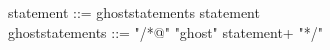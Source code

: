 \begin{syntax}
  statement ::= ghoststatements statement \\
  ghoststatements ::= "/*@" "ghost" statement+ "*/"
\end{syntax}

